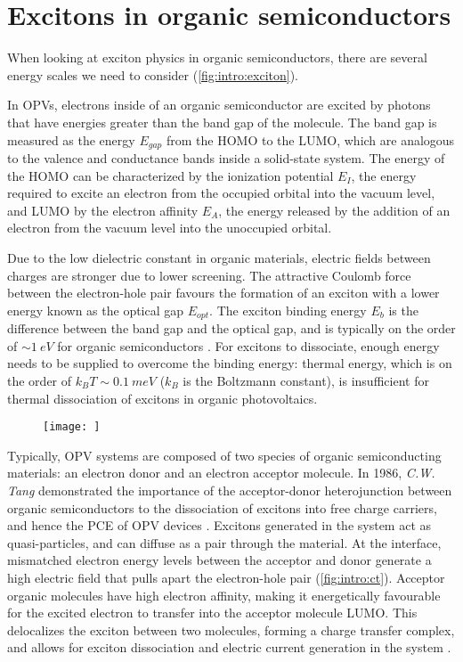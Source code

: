 \section{Excitons in organic semiconductors}

When looking at exciton physics in organic semiconductors, there are several energy scales we need to consider (\autoref{fig:intro:exciton}). 

In \acp{OPV}, electrons inside of an organic semiconductor are excited by photons that have energies greater than the band gap of the molecule. The band gap is measured as the energy $E_{gap}$ from the \ac{HOMO} to the \ac{LUMO}, which are analogous to the valence and conductance bands inside a solid-state system. The energy of the \ac{HOMO} can be characterized by the ionization potential $E_I$, the energy required to excite an electron from the occupied orbital into the vacuum level, and \ac{LUMO} by the electron affinity $E_A$, the energy released by the addition of an electron from the vacuum level into the unoccupied orbital.

Due to the low dielectric constant in organic materials, electric fields between charges are stronger due to lower screening. The attractive Coulomb force between the electron-hole pair favours the formation of an exciton with a lower energy known as the optical gap $E_{opt}$. The exciton binding energy $E_b$ is the difference between the band gap and the optical gap, and is typically on the order of $\sim \SI{1}{eV}$ for organic semiconductors \citep{knupfer2003exciton}. For excitons to dissociate, enough energy needs to be supplied to overcome the binding energy: thermal energy, which is on the order of $k_B T \sim \SI{0.1}{meV}$ ($k_B$ is the Boltzmann constant), is insufficient for thermal dissociation of excitons in organic photovoltaics.

\begin{figure}[h]
    \centering
    \texttt{[image: ]}
    \caption{}
    \label{fig:intro:exciton}
\end{figure}

Typically, \ac{OPV} systems are composed of two species of organic semiconducting materials: an electron donor and an electron acceptor molecule. In 1986, \textit{C.W. Tang} demonstrated the importance of the acceptor-donor heterojunction between organic semiconductors to the dissociation of excitons into free charge carriers, and hence the \ac{PCE} of \ac{OPV} devices \citep{tang1986two}. Excitons generated in the system act as quasi-particles, and can diffuse as a pair through the material. At the interface, mismatched electron energy levels between the acceptor and donor generate a high electric field that pulls apart the electron-hole pair (\autoref{fig:intro:ct}). Acceptor organic molecules have high electron affinity, making it energetically favourable for the excited electron to transfer into the acceptor molecule \ac{LUMO}. This delocalizes the exciton between two molecules, forming a charge transfer complex, and allows for exciton dissociation and electric current generation in the system \citep{bernardo2014delocalization}.

